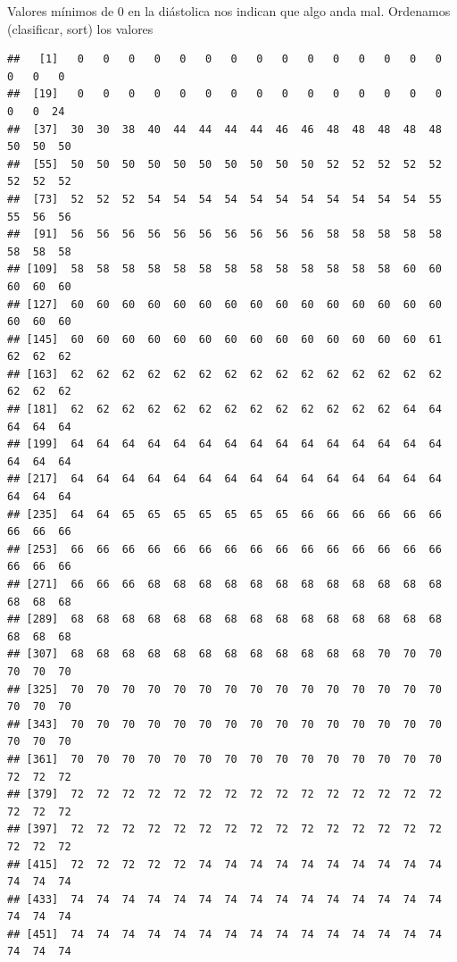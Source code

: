 \documentclass[
]{article}
\newenvironment{Shaded}{\begin{snugshade}}{\end{snugshade}}
\newcommand{\FunctionTok}[1]{\textcolor[rgb]{0.00,0.00,0.00}{#1}}
\newcommand{\NormalTok}[1]{#1}
\newcommand{\SpecialCharTok}[1]{\textcolor[rgb]{0.00,0.00,0.00}{#1}}
\begin{document}
Valores mínimos de 0 en la diástolica nos indican que algo anda mal.
Ordenamos (clasificar, sort) los valores

\begin{Shaded}
\end{Shaded}

\begin{verbatim}
##   [1]   0   0   0   0   0   0   0   0   0   0   0   0   0   0   0   0   0   0
##  [19]   0   0   0   0   0   0   0   0   0   0   0   0   0   0   0   0   0  24
##  [37]  30  30  38  40  44  44  44  44  46  46  48  48  48  48  48  50  50  50
##  [55]  50  50  50  50  50  50  50  50  50  50  52  52  52  52  52  52  52  52
##  [73]  52  52  52  54  54  54  54  54  54  54  54  54  54  54  55  55  56  56
##  [91]  56  56  56  56  56  56  56  56  56  56  58  58  58  58  58  58  58  58
## [109]  58  58  58  58  58  58  58  58  58  58  58  58  58  60  60  60  60  60
## [127]  60  60  60  60  60  60  60  60  60  60  60  60  60  60  60  60  60  60
## [145]  60  60  60  60  60  60  60  60  60  60  60  60  60  60  61  62  62  62
## [163]  62  62  62  62  62  62  62  62  62  62  62  62  62  62  62  62  62  62
## [181]  62  62  62  62  62  62  62  62  62  62  62  62  62  64  64  64  64  64
## [199]  64  64  64  64  64  64  64  64  64  64  64  64  64  64  64  64  64  64
## [217]  64  64  64  64  64  64  64  64  64  64  64  64  64  64  64  64  64  64
## [235]  64  64  65  65  65  65  65  65  65  66  66  66  66  66  66  66  66  66
## [253]  66  66  66  66  66  66  66  66  66  66  66  66  66  66  66  66  66  66
## [271]  66  66  66  68  68  68  68  68  68  68  68  68  68  68  68  68  68  68
## [289]  68  68  68  68  68  68  68  68  68  68  68  68  68  68  68  68  68  68
## [307]  68  68  68  68  68  68  68  68  68  68  68  68  70  70  70  70  70  70
## [325]  70  70  70  70  70  70  70  70  70  70  70  70  70  70  70  70  70  70
## [343]  70  70  70  70  70  70  70  70  70  70  70  70  70  70  70  70  70  70
## [361]  70  70  70  70  70  70  70  70  70  70  70  70  70  70  70  72  72  72
## [379]  72  72  72  72  72  72  72  72  72  72  72  72  72  72  72  72  72  72
## [397]  72  72  72  72  72  72  72  72  72  72  72  72  72  72  72  72  72  72
## [415]  72  72  72  72  72  74  74  74  74  74  74  74  74  74  74  74  74  74
## [433]  74  74  74  74  74  74  74  74  74  74  74  74  74  74  74  74  74  74
## [451]  74  74  74  74  74  74  74  74  74  74  74  74  74  74  74  74  74  74

\end{verbatim}
\end{document}
